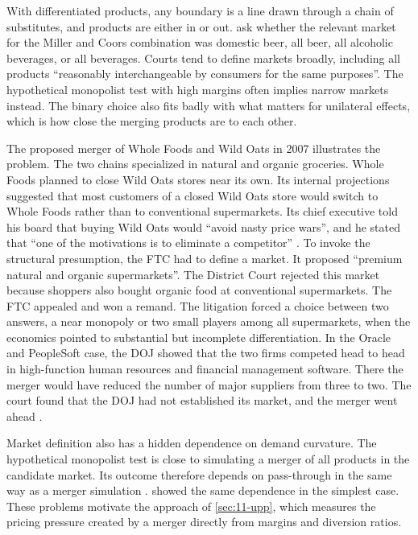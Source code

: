 With differentiated products, any boundary is a line drawn through a chain of substitutes, and products are
either in or out. \citet[p.~5]{FarrellShapiro2010} ask whether the relevant market for the Miller and Coors
combination was domestic beer, all beer, all alcoholic beverages, or all beverages. Courts tend to define
markets broadly, including all products ``reasonably interchangeable by consumers for the same purposes''. The
hypothetical monopolist test with high margins often implies narrow markets instead. The binary choice also fits
badly with what matters for unilateral effects, which is how close the merging products are to each other.

The proposed merger of Whole Foods and Wild Oats in 2007 illustrates the problem. The two chains specialized in
natural and organic groceries. Whole Foods planned to close Wild Oats stores near its own. Its internal projections
suggested that most customers of a closed Wild Oats store would switch to Whole Foods rather than to conventional
supermarkets. Its chief executive told his board that buying Wild Oats would ``avoid nasty price wars'', and he stated
that ``one of the motivations is to eliminate a competitor'' \citep[pp.~5--6]{FarrellShapiro2010}. To invoke the structural presumption, the FTC had to define a market. It
proposed ``premium natural and organic supermarkets''. The District Court rejected this market because shoppers
also bought organic food at conventional supermarkets. The FTC appealed and won a remand. The litigation forced a
choice between two answers, a near monopoly or two small players among all supermarkets, when the economics
pointed to substantial but incomplete differentiation. In the Oracle and PeopleSoft case, the DOJ showed that the
two firms competed head to head in high-function human resources and financial management software. There the
merger would have reduced the number of major suppliers from three to two. The court found that the DOJ had not
established its market, and the merger went ahead \citep[p.~6, n.~19]{FarrellShapiro2010}.

Market definition also has a hidden dependence on demand curvature. The hypothetical monopolist test is close to
simulating a merger of all products in the candidate market. Its outcome therefore depends on pass-through in the
same way as a merger simulation \citep[p.~25]{FarrellShapiro2010}.  showed the same dependence
in the simplest case. These problems motivate the approach of \cref{sec:11-upp}, which measures the pricing
pressure created by a merger directly from margins and diversion ratios.

